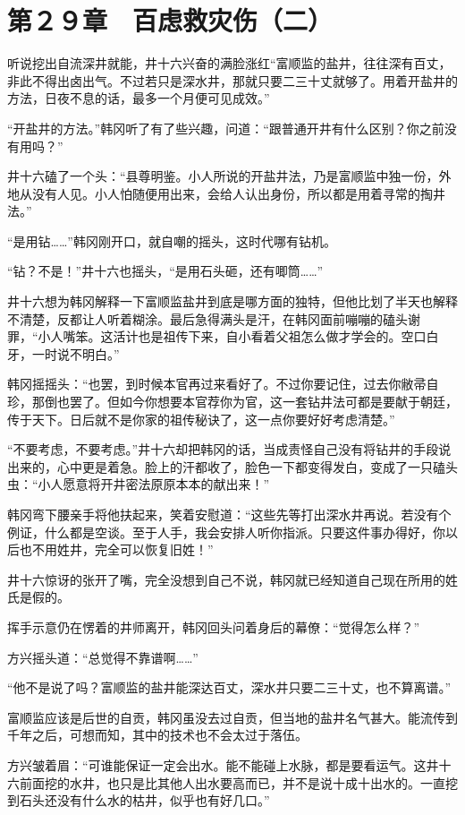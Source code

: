 \section{第２９章　百虑救灾伤（二）}

听说挖出自流深井就能，井十六兴奋的满脸涨红“富顺监的盐井，往往深有百丈，非此不得出卤出气。不过若只是深水井，那就只要二三十丈就够了。用着开盐井的方法，日夜不息的话，最多一个月便可见成效。”

“开盐井的方法。”韩冈听了有了些兴趣，问道：“跟普通开井有什么区别？你之前没有用吗？”

井十六磕了一个头：“县尊明鉴。小人所说的开盐井法，乃是富顺监中独一份，外地从没有人见。小人怕随便用出来，会给人认出身份，所以都是用着寻常的掏井法。”

“是用钻……”韩冈刚开口，就自嘲的摇头，这时代哪有钻机。

“钻？不是！”井十六也摇头，“是用石头砸，还有唧筒……”

井十六想为韩冈解释一下富顺监盐井到底是哪方面的独特，但他比划了半天也解释不清楚，反都让人听着糊涂。最后急得满头是汗，在韩冈面前嘣嘣的磕头谢罪，“小人嘴笨。这活计也是祖传下来，自小看着父祖怎么做才学会的。空口白牙，一时说不明白。”

韩冈摇摇头：“也罢，到时候本官再过来看好了。不过你要记住，过去你敝帚自珍，那倒也罢了。但如今你想要本官荐你为官，这一套钻井法可都是要献于朝廷，传于天下。日后就不是你家的祖传秘诀了，这一点你要好好考虑清楚。”

“不要考虑，不要考虑。”井十六却把韩冈的话，当成责怪自己没有将钻井的手段说出来的，心中更是着急。脸上的汗都收了，脸色一下都变得发白，变成了一只磕头虫：“小人愿意将开井密法原原本本的献出来！”

韩冈弯下腰亲手将他扶起来，笑着安慰道：“这些先等打出深水井再说。若没有个例证，什么都是空谈。至于人手，我会安排人听你指派。只要这件事办得好，你以后也不用姓井，完全可以恢复旧姓！”

井十六惊讶的张开了嘴，完全没想到自己不说，韩冈就已经知道自己现在所用的姓氏是假的。

挥手示意仍在愣着的井师离开，韩冈回头问着身后的幕僚：“觉得怎么样？”

方兴摇头道：“总觉得不靠谱啊……”

“他不是说了吗？富顺监的盐井能深达百丈，深水井只要二三十丈，也不算离谱。”

富顺监应该是后世的自贡，韩冈虽没去过自贡，但当地的盐井名气甚大。能流传到千年之后，可想而知，其中的技术也不会太过于落伍。

方兴皱着眉：“可谁能保证一定会出水。能不能碰上水脉，都是要看运气。这井十六前面挖的水井，也只是比其他人出水要高而已，并不是说十成十出水的。一直挖到石头还没有什么水的枯井，似乎也有好几口。”


